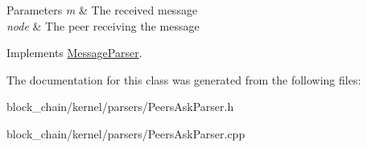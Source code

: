 \begin{DoxyParams}{Parameters}
{\em m} & The received message \\
\hline
{\em node} & The peer receiving the message \\
\hline
\end{DoxyParams}


Implements \mbox{\hyperlink{classMessageParser_a946f3b936dc01a75d6165329b159ecfe}{Message\+Parser}}.



The documentation for this class was generated from the following files\+:\begin{DoxyCompactItemize}
\item 
block\+\_\+chain/kernel/parsers/Peers\+Ask\+Parser.\+h\item 
block\+\_\+chain/kernel/parsers/Peers\+Ask\+Parser.\+cpp\end{DoxyCompactItemize}
